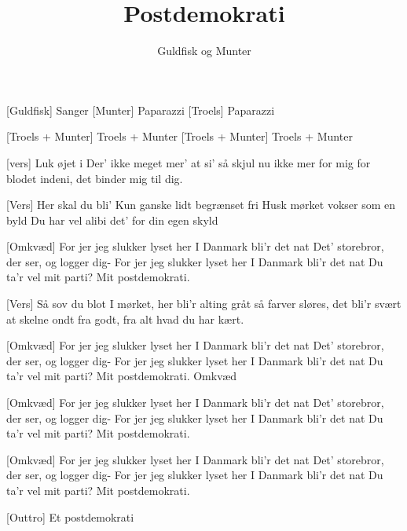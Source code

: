 \documentclass[a4paper,11pt]{article}
\title{Postdemokrati}
\author{Guldfisk og Munter}
\begin{document}
\maketitle

\begin{roles}  
[Guldfisk] Sanger
[Munter] Paparazzi
[Troels] Paparazzi
\end{roles}

\begin{props}
[Troels + Munter] Troels + Munter
[Troels + Munter] Troels + Munter
\end{props}

\begin{song}

[vers] Luk øjet i
Der' ikke meget mer' at si'
så skjul nu ikke mer for mig
for blodet indeni,
det binder mig til dig.
 
[Vers] Her skal du bli'
Kun ganske lidt begrænset fri
Husk mørket vokser som en byld
Du har vel alibi
det' for din egen skyld
 
[Omkvæd] For jer
jeg slukker lyset her
I Danmark bli'r det nat
Det' storebror, der ser,
og logger dig- For jer
jeg slukker lyset her
I Danmark bli'r det nat
Du ta'r vel mit parti?
Mit postdemokrati.
 
[Vers] Så sov du blot
I mørket, her bli'r alting gråt
så farver sløres, det bli'r svært
at skelne ondt fra godt,
fra alt hvad du har kært.
 
[Omkvæd] For jer
jeg slukker lyset her
I Danmark bli'r det nat
Det' storebror, der ser,
og logger dig- For jer
jeg slukker lyset her
I Danmark bli'r det nat
Du ta'r vel mit parti?
Mit postdemokrati.
Omkvæd


[Omkvæd] For jer
jeg slukker lyset her
I Danmark bli'r det nat
Det' storebror, der ser,
og logger dig- For jer
jeg slukker lyset her
I Danmark bli'r det nat
Du ta'r vel mit parti?
Mit postdemokrati.

[Omkvæd] For jer
jeg slukker lyset her
I Danmark bli'r det nat
Det' storebror, der ser,
og logger dig- For jer
jeg slukker lyset her
I Danmark bli'r det nat
Du ta'r vel mit parti?
Mit postdemokrati.

[Outtro] Et postdemokrati

\end{song}
\end{document}
